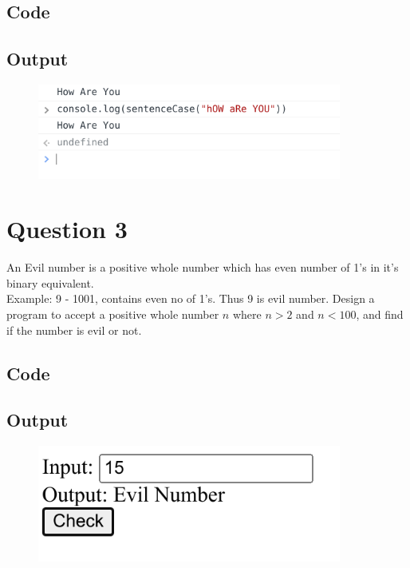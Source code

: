 \documentclass{article}
\begin{document}
\subsection*{Code}

\newpage
\subsection*{Output}
\begin{figure}[H]
  \centering
  \includegraphics[width=10cm]{2/out.png}
\end{figure}

\newpage
\section*{Question 3}
An Evil number is a positive whole number which has even number of 1's in
it's binary equivalent. \\
Example: 9 - 1001, contains even no of 1's. Thus 9 is evil number.
Design a program to accept a positive whole number $n$ where $n > 2$ and $n < 100$,
and find if the number is evil or not.
\subsection*{Code}

\newpage
\subsection*{Output}
\begin{figure}[H]
  \centering
  \includegraphics[width=10cm]{3/out.png}
\end{figure}
\end{document}
